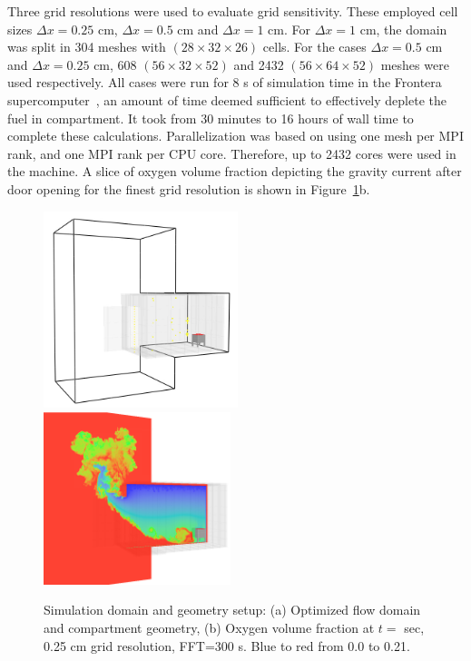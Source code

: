\documentclass[12pt,letterpaper]{article}
\begin{document}
\begin{flushleft}
Three grid resolutions were used to evaluate grid sensitivity. These employed cell sizes $\Delta x=0.25$ cm, $\Delta x=0.5$ cm and $\Delta x=1$ cm. For $\Delta x=1$ cm, the domain was split in 304 meshes with $(28\times32\times26)$ cells. For the cases $\Delta x=0.5$ cm and $\Delta x=0.25$ cm, 608 $(56\times32\times52)$ and 2432 $(56\times64\times52)$ meshes were used respectively. All cases were run for 8 s of simulation time in the Frontera supercomputer~\cite{frontera}, an amount of time deemed sufficient to effectively deplete the fuel in compartment. It took from 30 minutes to 16 hours of wall time to complete these calculations. Parallelization was based on using one mesh per MPI rank, and one MPI rank per CPU core. Therefore, up to 2432 cores were used in the machine. A slice of oxygen volume fraction depicting the gravity current after door opening for the finest grid resolution is shown in Figure~\ref{fig:Setupdomain}b.   

\begin{figure}[tb]
    \centering
    \includegraphics[trim = 5mm 5mm 5mm 5mm, clip,width=0.505\textwidth]{AOSFST_Paper/Figures/SetupDomain.png}
    \includegraphics[trim = 22mm 5mm 17mm 5mm, clip,width=0.485\textwidth]{AOSFST_Paper/Figures/X_O2_countour_Tvar_300s_t1p5s_B.png}
     \\
    \caption{Simulation domain and geometry setup: (a) Optimized flow domain and compartment geometry, (b) Oxygen volume fraction at $t=$ sec, 0.25 cm grid resolution, FFT=300 s. Blue to red from 0.0 to 0.21. }
    \label{fig:Setupdomain}
\end{figure}


\end{flushleft}
\end{document}
